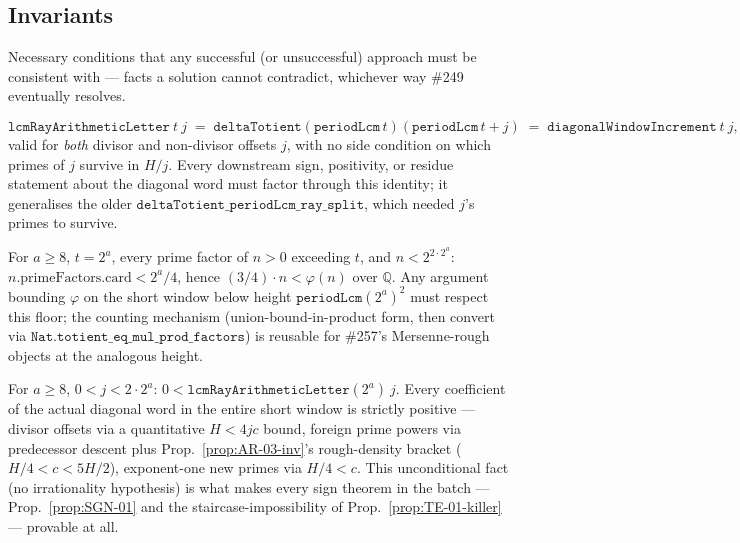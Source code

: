 \subsection{Invariants}

Necessary conditions that any successful (or unsuccessful) approach must be
consistent with — facts a solution cannot contradict, whichever way \#249
eventually resolves.

\begin{prop}\label{prop:AR-04-inv}
\[
\mathtt{lcmRayArithmeticLetter}\ t\ j \;=\; \mathtt{deltaTotient}(\mathtt{periodLcm}\,t)(\mathtt{periodLcm}\,t + j) \;=\; \mathtt{diagonalWindowIncrement}\ t\ j,
\]
valid for \emph{both} divisor and non-divisor offsets $j$, with no side condition on which primes
of $j$ survive in $H/j$. Every downstream sign, positivity, or residue statement about the
diagonal word must factor through this identity; it generalises the older
$\mathtt{deltaTotient\_periodLcm\_ray\_split}$, which needed $j$'s primes to survive.
\ \ \\
\end{prop}

\begin{prop}\label{prop:AR-03-inv}
For $a\ge8$, $t=2^a$, every prime factor of $n>0$ exceeding $t$, and $n<2^{2\cdot2^a}$:
$n.\mathrm{primeFactors.card} < 2^a/4$, hence $(3/4)\cdot n < \varphi(n)$ over $\mathbb Q$. Any
argument bounding $\varphi$ on the short window below height $\mathtt{periodLcm}(2^a)^2$ must
respect this floor; the counting mechanism (union-bound-in-product form, then convert via
$\mathtt{Nat.totient\_eq\_mul\_prod\_factors}$) is reusable for \#257's Mersenne-rough objects
at the analogous height.
\ \ \\
\end{prop}

\begin{prop}\label{prop:AR-05-inv}
For $a\ge8$, $0<j<2\cdot2^a$: $0<\mathtt{lcmRayArithmeticLetter}(2^a)\ j$. Every coefficient of
the actual diagonal word in the entire short window is strictly positive — divisor offsets via
a quantitative $H<4jc$ bound, foreign prime powers via predecessor descent plus
Prop.~\ref{prop:AR-03-inv}'s rough-density bracket ($H/4<c<5H/2$), exponent-one new primes via
$H/4<c$. This unconditional fact (no irrationality hypothesis) is what makes every sign theorem
in the batch — Prop.~\ref{prop:SGN-01} and the staircase-impossibility of
Prop.~\ref{prop:TE-01-killer} — provable at all.
\ \ \\
\end{prop}


